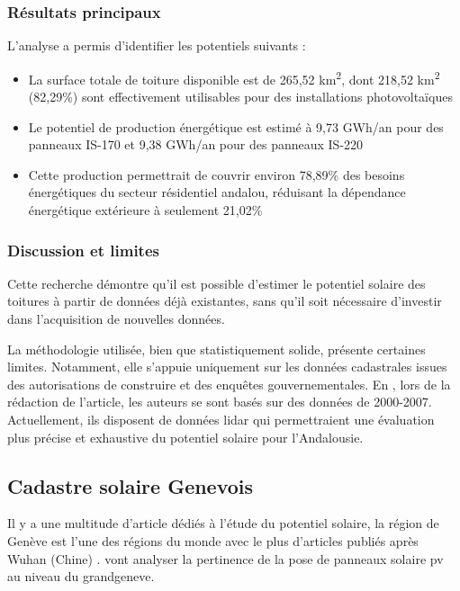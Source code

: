 \subsubsection{Résultats principaux}
\par{L'analyse a permis d'identifier les potentiels suivants :}
\begin{itemize}
    \item La surface totale de toiture disponible est de 265,52 \si{\unit{km^2}}, dont 218,52 \si{\unit{km^2}} (82,29\%) sont effectivement utilisables pour des installations photovoltaïques
    \item Le potentiel de production énergétique est estimé à 9,73 \si{\unit{GWh/an}} pour des panneaux IS-170 et 9,38 \si{\unit{GWh/an}} pour des panneaux IS-220
    \item Cette production permettrait de couvrir environ 78,89\% des besoins énergétiques du secteur résidentiel andalou, réduisant la dépendance énergétique extérieure à seulement 21,02\%
\end{itemize}

\subsubsection{Discussion et limites}
\par{Cette recherche démontre qu'il est possible d'estimer le potentiel solaire des toitures à partir de données déjà existantes, sans qu'il soit nécessaire d'investir dans l’acquisition de nouvelles données.}

\par{La méthodologie utilisée, bien que statistiquement solide, présente certaines limites. Notamment, elle s'appuie uniquement sur les données cadastrales issues des autorisations de construire et des enquêtes gouvernementales. En \citeyear{ordonez_analysis_2010}, lors de la rédaction de l'article, les auteurs se sont basés sur des données de 2000-2007. Actuellement, ils disposent de données \gls{lidar} \cite{nacional_plan_nodate} qui permettraient une évaluation plus précise et exhaustive du potentiel solaire pour l'Andalousie.}

\subsection{Cadastre solaire Genevois}

\par{Il y a une multitude d'article dédiés à l'étude du potentiel solaire, la région de Genève est l'une des régions du monde avec le plus d'articles publiés après Wuhan (Chine) \cite{drozd_evaluating_2025}. \citeauthor{thebault_large-scale_2022} \cite{thebault_large-scale_2022} vont analyser la pertinence de la pose de panneaux solaire \acrshort{pv} au niveau du \gls{grandgeneve}.}

